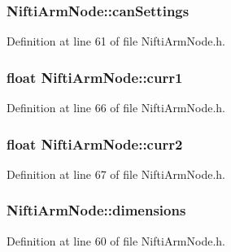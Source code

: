 \subsubsection[{can\-Settings}]{ {\bf \-Nifti\-Arm\-Node\-::can\-Settings}\hspace{0.3cm}{\ttfamily  [private]}}\label{classNiftiArmNode_a16668b9908670fd82b9bf815f9a458b0}


\-Definition at line 61 of file \-Nifti\-Arm\-Node.\-h.

\subsubsection[{curr1}]{\setlength{\rightskip}{0pt plus 5cm}float {\bf \-Nifti\-Arm\-Node\-::curr1}\hspace{0.3cm}{\ttfamily  [private]}}\label{classNiftiArmNode_ac43de745fe01c01a6504b81324c00e39}


\-Definition at line 66 of file \-Nifti\-Arm\-Node.\-h.

\subsubsection[{curr2}]{\setlength{\rightskip}{0pt plus 5cm}float {\bf \-Nifti\-Arm\-Node\-::curr2}\hspace{0.3cm}{\ttfamily  [private]}}\label{classNiftiArmNode_a32e3a070cd88f5d1e76c07e5d283da79}


\-Definition at line 67 of file \-Nifti\-Arm\-Node.\-h.

\subsubsection[{dimensions}]{ {\bf \-Nifti\-Arm\-Node\-::dimensions}\hspace{0.3cm}{\ttfamily  [private]}}\label{classNiftiArmNode_a2cac6d3d0c48a24570949850b1ff9cf4}


\-Definition at line 60 of file \-Nifti\-Arm\-Node.\-h.

